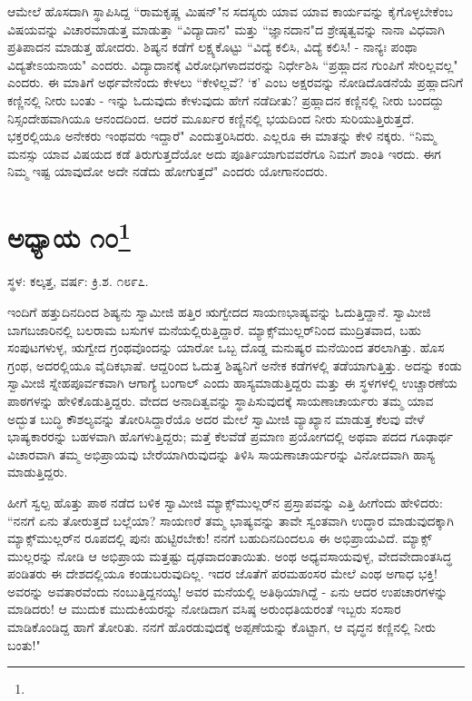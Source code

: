 ಆಮೇಲೆ ಹೊಸದಾಗಿ ಸ್ಥಾಪಿಸಿದ್ದ “ರಾಮಕೃಷ್ಣ ಮಿಷನ್"ನ ಸದಸ್ಯರು ಯಾವ ಯಾವ ಕಾರ್ಯವನ್ನು ಕೈಗೊಳ್ಳಬೇಕೆಂಬ ವಿಷಯವನ್ನು ವಿಚಾರಮಾಡುತ್ತ ಮಾಡುತ್ತಾ “ವಿದ್ಯಾದಾನ" ಮತ್ತು “ಜ್ಞಾನದಾನ"ದ ಶ್ರೇಷ್ಠತ್ವವನ್ನು ನಾನಾ ವಿಧವಾಗಿ ಪ್ರತಿಪಾದನ ಮಾಡುತ್ತ ಹೋದರು. ಶಿಷ್ಯನ ಕಡೆಗೆ ಲಕ್ಷ್ಯಕೊಟ್ಟು “ವಿದ್ಯೆ ಕಲಿಸಿ, ವಿದ್ಯೆ ಕಲಿಸಿ! - ನಾನ್ಯಃ ಪಂಥಾ ವಿದ್ಯತೇಽಯನಾಯ" ಎಂದರು. ವಿದ್ಯಾದಾನಕ್ಕೆ ವಿರೋಧಿಗಳಾದವರನ್ನು ನಿರ್ಧೇಶಿಸಿ “ಪ್ರಹ್ಲಾದನ ಗುಂಪಿಗೆ ಸೇರಿಲ್ಲವಲ್ಲ" ಎಂದರು. ಈ ಮಾತಿಗೆ ಅರ್ಥವೇನೆಂದು ಕೇಳಲು “ಕೇಳಿಲ್ಲವೆ? ‘ಕ’ ಎಂಬ ಅಕ್ಷರವನ್ನು ನೋಡಿದೊಡನೆಯೆ ಪ್ರಹ್ಲಾದನಿಗೆ ಕಣ್ಣಿನಲ್ಲಿ ನೀರು ಬಂತು - ಇನ್ನು ಓದುವುದು ಕೇಳುವುದು ಹೇಗೆ ನಡೆದೀತು? ಪ್ರಹ್ಲಾದನ ಕಣ್ಣಿನಲ್ಲಿ ನೀರು ಬಂದದ್ದು ನಿಸ್ಸಂದೇಹವಾಗಿಯೂ ಆನಂದದಿಂದ. ಆದರೆ ಮೂರ್ಖರ ಕಣ್ಣಿನಲ್ಲಿ ಭಯದಿಂದ ನೀರು ಸುರಿಯುತ್ತಿರುತ್ತದೆ. ಭಕ್ತರಲ್ಲಿಯೂ ಅನೇಕರು ಇಂಥವರು ಇದ್ದಾರೆ" ಎಂದುತ್ತರಿಸಿದರು. ಎಲ್ಲರೂ ಈ ಮಾತನ್ನು ಕೇಳಿ ನಕ್ಕರು. “ನಿಮ್ಮ ಮನಸ್ಸು ಯಾವ ವಿಷಯದ ಕಡೆ ತಿರುಗುತ್ತದೆಯೋ ಅದು ಪೂರ್ತಿಯಾಗುವವರೆಗೂ ನಿಮಗೆ ಶಾಂತಿ ಇರದು. ಈಗ ನಿಮ್ಮ ಇಷ್ಟ ಯಾವುದೋ ಅದೇ ನಡೆದು ಹೋಗುತ್ತದೆ" ಎಂದರು ಯೋಗಾನಂದರು.

\newpage

\chapter[ಅಧ್ಯಾಯ ೧೦]{ಅಧ್ಯಾಯ ೧೦\protect\footnote{}}

\begin{center}
ಸ್ಥಳ: ಕಲ್ಕತ್ತ, ವರ್ಷ: ಕ್ರಿ.ಶ. ೧೮೯೭.
\end{center}

ಇಂದಿಗೆ ಹತ್ತುದಿನದಿಂದ ಶಿಷ್ಯನು ಸ್ವಾಮೀಜಿ ಹತ್ತಿರ ಋಗ್ವೇದದ ಸಾಯಣಭಾಷ್ಯವನ್ನು ಓದುತ್ತಿದ್ದಾನೆ. ಸ್ವಾಮೀಜಿ ಬಾಗಬಜಾರಿನಲ್ಲಿ ಬಲರಾಮ ಬಸುಗಳ ಮನೆಯಲ್ಲಿರುತ್ತಿದ್ದಾರೆ. ಮ್ಯಾಕ್ಸ್‌ಮುಲ್ಲರ್‌ನಿಂದ ಮುದ್ರಿತವಾದ, ಬಹು ಸಂಪುಟಗಳುಳ್ಳ, ಋಗ್ವೇದ ಗ್ರಂಥವೊಂದನ್ನು ಯಾರೋ ಒಬ್ಬ ದೊಡ್ಡ ಮನುಷ್ಯರ ಮನೆಯಿಂದ ತರಲಾಗಿತ್ತು. ಹೊಸ ಗ್ರಂಥ, ಅದರಲ್ಲಿಯೂ ವೈದಿಕಭಾಷೆ. ಆದ್ದರಿಂದ ಓದುತ್ತ ಶಿಷ್ಯನಿಗೆ ಅನೇಕ ಕಡೆಗಳಲ್ಲಿ ತಡೆಯಾಗುತ್ತಿತ್ತು. ಅದನ್ನು ಕಂಡು ಸ್ವಾಮೀಜಿ ಸ್ನೇಹಪೂರ್ವಕವಾಗಿ ಆಗಾಗ್ಯೆ ಬಂಗಾಲ್ ಎಂದು ಹಾಸ್ಯಮಾಡುತ್ತಿದ್ದರು ಮತ್ತು ಈ ಸ್ಥಳಗಳಲ್ಲಿ ಉಚ್ಚಾರಣೆಯ ಪಾಠಗಳನ್ನು ಹೇಳಿಕೊಡುತ್ತಿದ್ದರು. ವೇದದ ಅನಾದಿತ್ವವನ್ನು ಸ್ಥಾಪಿಸುವುದಕ್ಕೆ ಸಾಯಣಾಚಾರ್ಯರು ತಮ್ಮ ಯಾವ ಅದ್ಭುತ ಬುದ್ಧಿ ಕೌಶಲ್ಯವನ್ನು ತೋರಿಸಿದ್ದಾರೆಯೊ ಅದರ ಮೇಲೆ ಸ್ವಾಮೀಜಿ ವ್ಯಾಖ್ಯಾನ ಮಾಡುತ್ತ ಕೆಲವು ವೇಳೆ ಭಾಷ್ಯಕಾರರನ್ನು ಬಹಳವಾಗಿ ಹೊಗಳುತ್ತಿದ್ದರು; ಮತ್ತೆ ಕೆಲವೆಡೆ ಪ್ರಮಾಣ ಪ್ರಯೋಗದಲ್ಲಿ ಅಥವಾ ಪದದ ಗೂಢಾರ್ಥ ವಿಚಾರವಾಗಿ ತಮ್ಮ ಅಭಿಪ್ರಾಯವು ಬೇರೆಯಾಗಿರುವುದನ್ನು ತಿಳಿಸಿ ಸಾಯಣಾಚಾರ್ಯರನ್ನು ವಿನೋದವಾಗಿ ಹಾಸ್ಯ ಮಾಡುತ್ತಿದ್ದರು.

ಹೀಗೆ ಸ್ವಲ್ಪ ಹೊತ್ತು ಪಾಠ ನಡೆದ ಬಳಿಕ ಸ್ವಾಮೀಜಿ ಮ್ಯಾಕ್ಸ್‌ಮುಲ್ಲರ್‌ನ ಪ್ರಸ್ತಾಪವನ್ನು ಎತ್ತಿ ಹೀಗೆಂದು ಹೇಳಿದರು: “ನನಗೆ ಏನು ತೋರುತ್ತದೆ ಬಲ್ಲೆಯಾ? ಸಾಯಣರೆ ತಮ್ಮ ಭಾಷ್ಯವನ್ನು ತಾವೇ ಸ್ವಂತವಾಗಿ ಉದ್ಧಾರ ಮಾಡುವುದಕ್ಕಾಗಿ ಮ್ಯಾಕ್ಸ್‌ಮುಲ್ಲರ್‌ನ ರೂಪದಲ್ಲಿ ಪುನಃ ಹುಟ್ಟಿರಬೇಕು! ನನಗೆ ಬಹುದಿನದಿಂದಲೂ ಈ ಅಭಿಪ್ರಾಯವಿದೆ. ಮ್ಯಾಕ್ಸ್ ಮುಲ್ಲರನ್ನು ನೋಡಿ ಆ ಅಭಿಪ್ರಾಯ ಮತ್ತಷ್ಟು ದೃಢವಾದಂತಾಯಿತು. ಅಂಥ ಅಧ್ಯವಸಾಯವುಳ್ಳ, ವೇದವೇದಾಂತಸಿದ್ಧ ಪಂಡಿತರು ಈ ದೇಶದಲ್ಲಿಯೂ ಕಂಡುಬರುವುದಿಲ್ಲ. ಇದರ ಜೊತೆಗೆ ಪರಮಹಂಸರ ಮೇಲೆ ಎಂಥ ಅಗಾಧ ಭಕ್ತಿ! ಅವರನ್ನು ಅವತಾರವೆಂದು ನಂಬುತ್ತಿದ್ದನಯ್ಯ! ಅವರ ಮನೆಯಲ್ಲಿ ಅತಿಥಿಯಾಗಿದ್ದೆ - ಏನು ಆದರ ಉಪಚಾರಗಳನ್ನು ಮಾಡಿದರು! ಆ ಮುದುಕ ಮುದುಕಿಯರನ್ನು ನೋಡಿದಾಗ ವಸಿಷ್ಠ ಅರುಂಧತಿಯರಂತೆ ಇಬ್ಬರು ಸಂಸಾರ ಮಾಡಿಕೊಂಡಿದ್ದ ಹಾಗೆ ತೋರಿತು. ನನಗೆ ಹೊರಡುವುದಕ್ಕೆ ಅಪ್ಪಣೆಯನ್ನು ಕೊಟ್ಟಾಗ, ಆ ವೃದ್ಧನ ಕಣ್ಣಿನಲ್ಲಿ ನೀರು ಬಂತು!"

